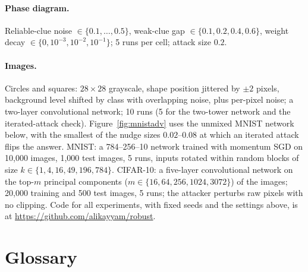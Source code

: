 \documentclass[11pt]{article}
\begin{document}
\paragraph{Phase diagram.} Reliable-clue noise $\in\{0.1,\ldots,0.5\}$, weak-clue gap $\in\{0.1,0.2,0.4,0.6\}$, weight decay $\in\{0,10^{-3},10^{-2},10^{-1}\}$; 5 runs per cell; attack size $0.2$.

\paragraph{Images.} Circles and squares: $28\times28$ grayscale, shape position jittered by $\pm2$ pixels, background level shifted by class with overlapping noise, plus per-pixel noise; a two-layer convolutional network; 10 runs (5 for the two-tower network and the iterated-attack check).
Figure~\ref{fig:mnistadv} uses the unmixed MNIST network below, with the smallest of the nudge sizes $0.02$--$0.08$ at which an iterated attack flips the answer. MNIST: a 784--256--10 network trained with momentum SGD on 10{,}000 images, 1{,}000 test images, 5 runs, inputs rotated within random blocks of size $k\in\{1,4,16,49,196,784\}$. CIFAR-10: a five-layer convolutional network on the top-$m$ principal components
($m\in\{16,64,256,1024,3072\}$) of the images; 20{,}000 training and 500 test images, 5 runs; the attacker perturbs raw pixels with no clipping. Code for all experiments, with fixed seeds and the settings above, is at \url{https://github.com/alikayyam/robust}.

\section{Glossary}
\label{sec:glossary}
\end{document}
